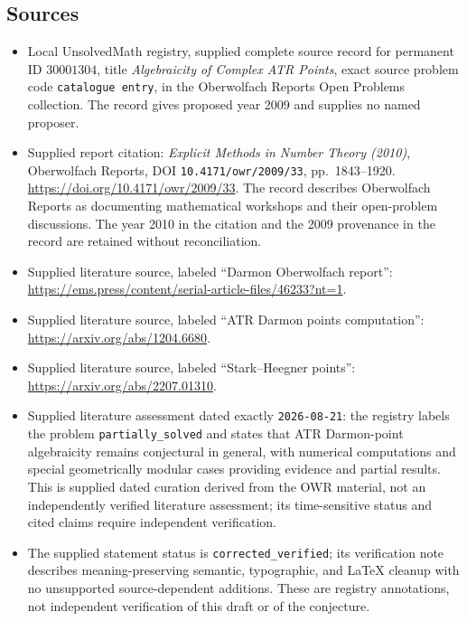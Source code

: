 \documentclass[11pt]{article}
\begin{document}
\subsection{Sources}
\begin{itemize}
\item Local UnsolvedMath registry, supplied complete source record for permanent ID \(30001304\), title \emph{Algebraicity of Complex ATR Points}, exact source problem code \texttt{catalogue entry}, in the Oberwolfach Reports Open Problems collection. The record gives proposed year 2009 and supplies no named proposer.
\item Supplied report citation: \emph{Explicit Methods in Number Theory (2010)}, Oberwolfach Reports, DOI \texttt{10.4171/owr/2009/33}, pp.~1843--1920. \url{https://doi.org/10.4171/owr/2009/33}. The record describes Oberwolfach Reports as documenting mathematical workshops and their open-problem discussions. The year 2010 in the citation and the 2009 provenance in the record are retained without reconciliation.
\item Supplied literature source, labeled ``Darmon Oberwolfach report'': \url{https://ems.press/content/serial-article-files/46233?nt=1}.
\item Supplied literature source, labeled ``ATR Darmon points computation'': \url{https://arxiv.org/abs/1204.6680}.
\item Supplied literature source, labeled ``Stark--Heegner points'': \url{https://arxiv.org/abs/2207.01310}.
\item Supplied literature assessment dated exactly \texttt{2026-08-21}: the registry labels the problem \texttt{partially\_solved} and states that ATR Darmon-point algebraicity remains conjectural in general, with numerical computations and special geometrically modular cases providing evidence and partial results. This is supplied dated curation derived from the OWR material, not an independently verified literature assessment; its time-sensitive status and cited claims require independent verification.
\item The supplied statement status is \texttt{corrected\_verified}; its verification note describes meaning-preserving semantic, typographic, and LaTeX cleanup with no unsupported source-dependent additions. These are registry annotations, not independent verification of this draft or of the conjecture.
\end{itemize}
\end{document}
